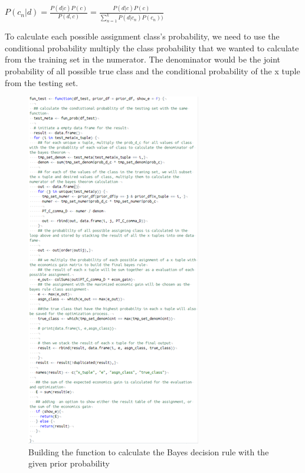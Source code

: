 \documentclass{article}
\begin{document}
\begin{multicols}{2}
        $P(c_n|d)= \frac{P(d | c)P(c)}{P(d,c)} = \frac{P(d|c)P(c)}{\sum_{n=1}^k P(d|c_n)P(c_n))}$

        To calculate each possible assignment class's probability, we need to use the conditional probability multiply the class probability that we wanted to calculate from the training set in the numerator. The denominator would be the joint probability of all possible true class and the conditional probability of the x tuple from the testing set. 

        \begin{figure}[H]
            \centering  
            \includegraphics[width=\linewidth]{fig7.png}
            \caption{Building the function to calculate the Bayes decision rule with the given prior probability}
        \end{figure}


\end{multicols}
\end{document}
